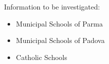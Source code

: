\documentclass{article}
\theoremstyle{definition}
\theoremstyle{remark}
\begin{document}
\clearpage
Information to be investigated:
\begin{itemize}
	\item Municipal Schools of Parma
	\item Municipal Schools of Padova
	\item Catholic Schools
\end{itemize}


\clearpage
{}


\pagebreak
\end{document}

